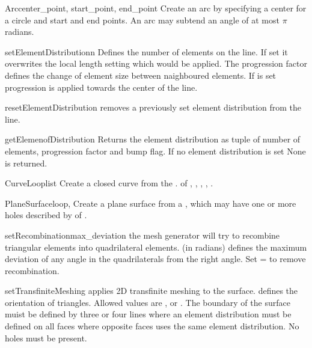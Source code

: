 \begin{classdesc}{Arc}{center_point, start_point, end_point}
Create an arc by specifying a center for a circle and start and end points. An arc may subtend an angle of at most $\pi$ radians.
\end{classdesc}
\begin{methoddesc}[Arc]{setElementDistribution}{n}
Defines the number of elements on the line. If set it overwrites the local length setting which would be applied. The progression factor  defines the change of element size between naighboured elements. If  is set
progression is applied towards the center of the line.
\end{methoddesc}
\begin{methoddesc}[Arc]{resetElementDistribution}{}
removes a previously set element distribution from the line.
\end{methoddesc}
\begin{methoddesc}[Arc]{getElemenofDistribution}{}
Returns the element distribution as tuple of
number of elements, progression factor and bump flag. If
no element distribution is set None is returned.
\end{methoddesc}

\begin{classdesc}{CurveLoop}{list}
Create a closed curve from the . of
, , , ,
.
\end{classdesc}

\begin{classdesc}{PlaneSurface}{loop, }
Create a plane surface from a , which may have one or more holes
described by  of .
\end{classdesc}
\begin{methoddesc}[PlaneSurface]{setRecombination}{max_deviation}
the mesh generator will try to recombine triangular elements 
into quadrilateral elements.  (in radians) defines the
maximum deviation of any angle in the quadrilaterals from the right angle.  
Set = to remove recombination.
\end{methoddesc}
\begin{methoddesc}[PlaneSurface]{setTransfiniteMeshing}{}
applies 2D transfinite meshing to the surface. 
 defines the orientation of triangles. Allowed values
are ,  or . The 
boundary of the surface muist be defined by three or four lines where an
element distribution must be defined on all faces where opposite 
faces uses the same element distribution. No holes must be present.
\end{methoddesc}



